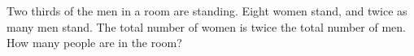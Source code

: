 Two thirds of the men in a room are standing. Eight women stand, and twice as many men stand. The total number of women is twice the total number of men. How many people are in the room?
